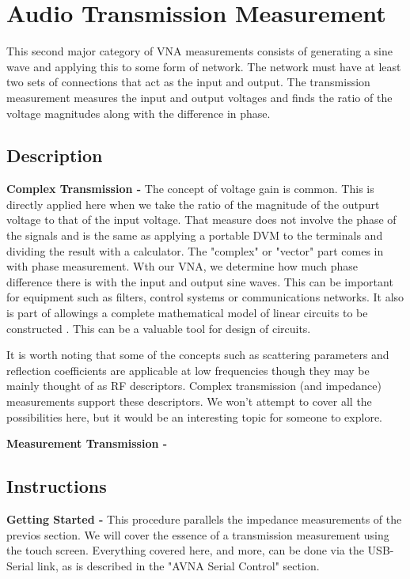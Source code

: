 \section{Audio Transmission Measurement}
This second major category of VNA measurements consists of generating a sine wave and applying this to some form of network.
 The network must have at least two sets of connections that act as the input and output.
The transmission measurement measures the input and output voltages and finds the ratio of the voltage magnitudes along with the difference in phase.
%
\subsection{Description}
\textbf{Complex Transmission - }The concept of voltage gain  is common.  
This is directly applied here when we take the ratio of the magnitude of the outpurt voltage to that of the input voltage.  
That measure does not involve the phase of the signals and is the same as applying a portable DVM to the terminals and dividing the result with a calculator.   
The "complex" or "vector" part comes in with phase measurement.  
Wth our VNA, we determine how much phase difference there is with the input and output sine waves.
This can be important for equipment such as  filters, control systems or communications networks.
It also is part of allowings a complete mathematical model of linear circuits to be constructed .  This can be a valuable tool for design of circuits.

It is worth noting that some of the concepts such as scattering parameters and reflection coefficients are applicable at low frequencies though they may be mainly thought of as RF descriptors.  Complex transmission (and impedance) measurements support these descriptors.  We won't attempt to cover all the possibilities here, but it would be an interesting topic for someone to explore.

\textbf{Measurement Transmission - }

\subsection{Instructions}
\textbf{Getting Started - }This procedure parallels the impedance measurements of the previos section.  We will cover the essence of a transmission measurement using the touch screen.
Everything covered here, and more, can be done via the USB-Serial link, as is described in the "AVNA Serial Control" section.

